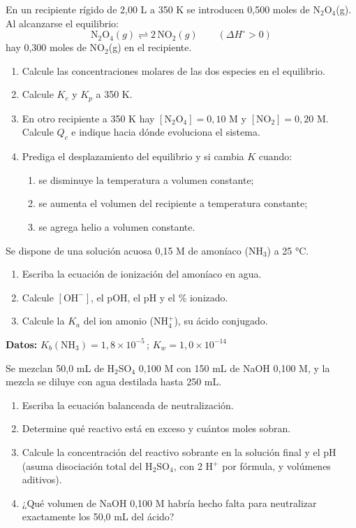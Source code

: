 \documentclass[11pt]{article}
\newcommand{\ejercicio}[1]{\par\vspace{10pt}{\large\bfseries\color{NavyBlue}Ejercicio #1}\par
  \nointerlineskip\vspace{2pt}{\color{NavyBlue!40}\rule{\linewidth}{0.4pt}}\par\vspace{2pt}}
\begin{document}
\ejercicio{3}
En un recipiente rígido de 2,00 L a 350 K se introducen 0,500 moles de N\(_2\)O\(_4\)(g). Al alcanzarse el equilibrio:
\[\text{N}_2\text{O}_4(g) \rightleftharpoons 2\,\text{NO}_2(g) \qquad (\Delta H^\circ > 0)\]
hay 0,300 moles de NO\(_2\)(g) en el recipiente.
\begin{enumerate}
\item Calcule las concentraciones molares de las dos especies en el equilibrio.
\item Calcule \(K_c\) y \(K_p\) a 350 K.
\item En otro recipiente a 350 K hay \([\text{N}_2\text{O}_4] = 0{,}10\) M y \([\text{NO}_2] = 0{,}20\) M. Calcule \(Q_c\) e indique hacia dónde evoluciona el sistema.
\item Prediga el desplazamiento del equilibrio y si cambia \(K\) cuando:
  \begin{enumerate}
  \item se disminuye la temperatura a volumen constante;
  \item se aumenta el volumen del recipiente a temperatura constante;
  \item se agrega helio a volumen constante.
  \end{enumerate}
\end{enumerate}

\newpage
\ejercicio{4}
Se dispone de una solución acuosa 0,15 M de amoníaco (NH\(_3\)) a 25 °C.
\begin{enumerate}
\item Escriba la ecuación de ionización del amoníaco en agua.
\item Calcule \([\text{OH}^-]\), el pOH, el pH y el \% ionizado.
\item Calcule la \(K_a\) del ion amonio (NH\(_4^+\)), su ácido conjugado.
\end{enumerate}
\begin{datos}
\textbf{Datos:} \(K_b(\text{NH}_3) = 1{,}8\times10^{-5}\)\,; \(K_w = 1{,}0\times10^{-14}\)
\end{datos}

\ejercicio{5}
Se mezclan 50,0 mL de H\(_2\)SO\(_4\) 0,100 M con 150 mL de NaOH 0,100 M, y la mezcla se diluye con agua destilada hasta 250 mL.
\begin{enumerate}
\item Escriba la ecuación balanceada de neutralización.
\item Determine qué reactivo está en exceso y cuántos moles sobran.
\item Calcule la concentración del reactivo sobrante en la solución final y el pH (asuma disociación total del H\(_2\)SO\(_4\), con 2 H\(^+\) por fórmula, y volúmenes aditivos).
\item ¿Qué volumen de NaOH 0,100 M habría hecho falta para neutralizar exactamente los 50,0 mL del ácido?
\end{enumerate}
\end{document}
